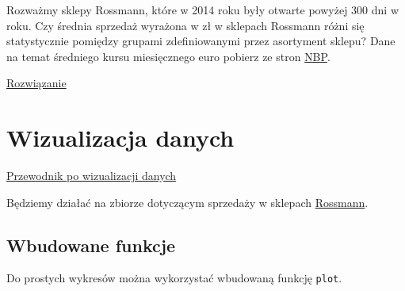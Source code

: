 \documentclass[]{book}
\newenvironment{Shaded}{\begin{snugshade}}{\end{snugshade}}
\newcommand{\KeywordTok}[1]{\textcolor[rgb]{0.13,0.29,0.53}{\textbf{#1}}}
\newcommand{\DataTypeTok}[1]{\textcolor[rgb]{0.13,0.29,0.53}{#1}}
\newcommand{\DecValTok}[1]{\textcolor[rgb]{0.00,0.00,0.81}{#1}}
\newcommand{\StringTok}[1]{\textcolor[rgb]{0.31,0.60,0.02}{#1}}
\newcommand{\OperatorTok}[1]{\textcolor[rgb]{0.81,0.36,0.00}{\textbf{#1}}}
\newcommand{\NormalTok}[1]{#1}
\begin{document}
Rozważmy sklepy Rossmann, które w 2014 roku były otwarte powyżej 300 dni
w roku. Czy średnia sprzedaż wyrażona w zł w sklepach Rossmann różni się
statystycznie pomiędzy grupami zdefiniowanymi przez asortyment sklepu?
Dane na temat średniego kursu miesięcznego euro pobierz ze stron
\href{http://www.nbp.pl/home.aspx?f=/kursy/arch_a.html}{NBP}.

\href{nb/rossmann_analiza.Rmd}{Rozwiązanie}

\chapter{Wizualizacja danych}\label{wizualizacja-danych}

\href{https://www.data-to-viz.com/}{Przewodnik po wizualizacji danych}

Będziemy działać na zbiorze dotyczącym sprzedaży w sklepach
\href{data/rossmann.xlsx}{Rossmann}.

\begin{Shaded}
\end{Shaded}

\section{Wbudowane funkcje}\label{wbudowane-funkcje}

Do prostych wykresów można wykorzystać wbudowaną funkcję \texttt{plot}.

\begin{Shaded}
\end{Shaded}
\end{document}
